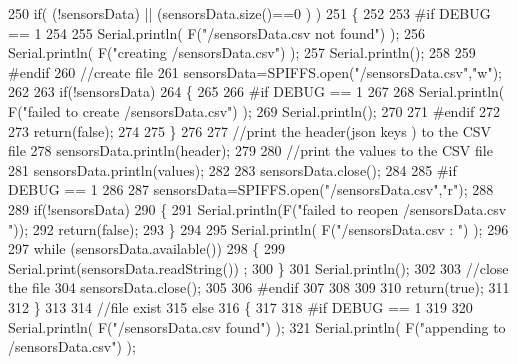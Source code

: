 \begin{DoxyCode}
250     \textcolor{keywordflow}{if}( (!sensorsData) || (sensorsData.size()==0 ) )
251     \{
252     
253 \textcolor{preprocessor}{    #if DEBUG == 1}
254     
255         Serial.println( F(\textcolor{stringliteral}{"/sensorsData.csv not found"}) );
256         Serial.println( F(\textcolor{stringliteral}{"creating /sensorsData.csv"}) );
257         Serial.println();
258     
259 \textcolor{preprocessor}{    #endif}
260         \textcolor{comment}{//create file}
261         sensorsData=SPIFFS.open(\textcolor{stringliteral}{"/sensorsData.csv"},\textcolor{stringliteral}{"w"});
262         
263         \textcolor{keywordflow}{if}(!sensorsData)
264         \{
265 
266 \textcolor{preprocessor}{        #if DEBUG == 1}
267         
268             Serial.println( F(\textcolor{stringliteral}{"failed to create /sensorsData.csv"}) );
269             Serial.println();
270         
271 \textcolor{preprocessor}{        #endif}
272         
273             \textcolor{keywordflow}{return}(\textcolor{keyword}{false});
274 
275         \}
276         
277         \textcolor{comment}{//print the header(json keys ) to the CSV file}
278         sensorsData.println(header);
279 
280         \textcolor{comment}{//print the values to the CSV file}
281         sensorsData.println(values);
282         
283         sensorsData.close();
284     
285 \textcolor{preprocessor}{    #if DEBUG == 1}
286 
287         sensorsData=SPIFFS.open(\textcolor{stringliteral}{"/sensorsData.csv"},\textcolor{stringliteral}{"r"});
288         
289         \textcolor{keywordflow}{if}(!sensorsData)
290         \{
291             Serial.println(F(\textcolor{stringliteral}{"failed to reopen /sensorsData.csv "}));
292             \textcolor{keywordflow}{return}(\textcolor{keyword}{false});      
293         \}
294 
295         Serial.println( F(\textcolor{stringliteral}{"/sensorsData.csv : "}) );
296 
297         \textcolor{keywordflow}{while} (sensorsData.available()) 
298         \{
299             Serial.print(sensorsData.readString()) ;
300         \}
301         Serial.println();
302 
303         \textcolor{comment}{//close the file}
304         sensorsData.close();
305 
306 \textcolor{preprocessor}{    #endif}
307         
308 
309         
310         \textcolor{keywordflow}{return}(\textcolor{keyword}{true});
311         
312     \}
313 
314     \textcolor{comment}{//file exist}
315     \textcolor{keywordflow}{else}
316     \{
317 
318 \textcolor{preprocessor}{    #if DEBUG == 1}
319     
320         Serial.println( F(\textcolor{stringliteral}{"/sensorsData.csv  found"}) );
321         Serial.println( F(\textcolor{stringliteral}{"appending to /sensorsData.csv"}) );

\end{DoxyCode}
